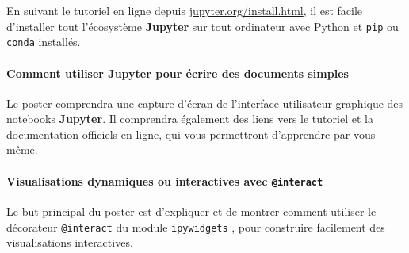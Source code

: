 \documentclass[runningheads]{llncs}
\newcommand{\Jupyter}{\textbf{Jupyter}}
\begin{document}
En suivant le tutoriel en ligne depuis \url{jupyter.org/install.html}, il est facile d'installer tout l'écosystème \Jupyter{} sur tout ordinateur avec Python et \texttt{pip} ou \texttt{conda} installés.


\paragraph{Comment utiliser \Jupyter{} pour écrire des documents simples}

Le poster comprendra une capture d'écran de l'interface utilisateur graphique des notebooks \Jupyter{}.
Il comprendra également des liens vers le tutoriel et la documentation officiels en ligne, qui vous permettront d'apprendre par vous-même.

\paragraph{Visualisations dynamiques ou interactives avec \texttt{@interact}}

Le but principal du poster est d'expliquer et de montrer comment utiliser le décorateur \texttt{@interact} du module \texttt{ipywidgets} \cite{ipywidgets}, pour construire facilement des visualisations interactives.





\end{document}
